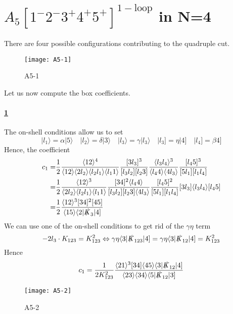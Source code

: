 \section{$A_5[1^-2^-3^+4^+5^+]^{\mathrm{1-loop}}$ in N=4}
There are four possible configurations contributing to the quadruple cut.
\begin{figure}[h!]
  \centering
    \texttt{[image: A5-1]}
    \caption{A5-1}
  \label{A5-1}
\end{figure}
Let us now compute the box coefficients.
%
\paragraph{\ref{A5-1}}
The on-shell conditions allow us to set
\begin{equation*}
|l_1\rangle = \alpha |5\rangle \quad
|l_2\rangle = \delta |3\rangle \quad
|l_3\rangle = \gamma |l_3\rangle\quad
|l_3] = \eta|4]\quad
|l_4] = \beta 4]
\end{equation*}
Hence, the coefficient
\begin{equation*}
\begin{split}
c_1 = &
\frac{1}{2}\frac{\langle 12 \rangle^4}{\langle 1 2 \rangle \langle 2 l_2\rangle \langle l_2 l_1 \rangle\langle l_1 1 \rangle}
\frac{[3l_3]^3}{[l_3 l_2][l_2 3]}
\frac{\langle l_3 l_4 \rangle^{3}}{\langle l_4 4 \rangle \langle 4 l_3\rangle}
\frac{[l_4 5 ]^3}{[5l_1][l_1 l_4]}
\\
= & 
\frac{1}{2}\frac{\langle 12 \rangle^3}{\langle 2 l_2 \rangle\langle l_2 l_1 \rangle\langle l_1 1\rangle}
\frac{[34]^2\langle l_4 4\rangle}{[l_3 l_2][l_2 3]\langle 4 l_3\rangle}
\frac{[l_4 5]^2}{[5l_1 ][l_1 l_4]}
[3 l_3]\langle l_3 l_4 \rangle [l_4 5]
\\
= &
\frac{1}{2}
\frac{\langle 12 \rangle^3[34]^2[45]}{\langle 15 \rangle\langle2|\slashed{K}_{3}|4]}
\end{split}
\end{equation*}
%
\color{gray}
We can use one of the on-shell conditions to get rid of the $\gamma\eta$ term
\begin{equation*}
-2l_3\cdot K_{123} = K_{123}^2 \Leftrightarrow \gamma\eta\langle 3 | \slashed{K}_{123}|4] = \gamma\eta\langle 3 | \slashed{K}_{12}|4] = K_{123}^2
\end{equation*}
Hence 
\begin{equation*}
c_1 = \frac{1}{2 K_{123}^2}\frac{\langle 2 1 \rangle^3 [34]\langle 45 \rangle\langle 3 | \slashed{K}_{12}|4]}{\langle 23 \rangle\langle 34 \rangle \langle 5 |\slashed{K}_{12}|3]}
\end{equation*}
\color{black}
%
%
%
\iffalse
\begin{figure}[h!]
  \centering
    \texttt{[image: A5-2]}
    \caption{A5-2}
  \label{A5-2}
\end{figure}
